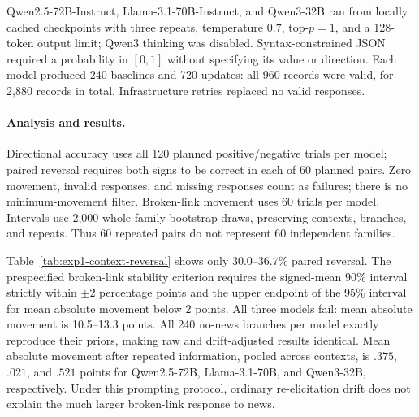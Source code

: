 Qwen2.5-72B-Instruct, Llama-3.1-70B-Instruct, and Qwen3-32B ran from locally cached
checkpoints with three repeats, temperature $0.7$, top-$p=1$, and a 128-token
output limit; Qwen3 thinking was disabled. Syntax-constrained JSON required a
probability in $[0,1]$ without specifying its value or direction. Each model
produced 240 baselines and 720 updates: all 960 records were valid, for 2,880
records in total. Infrastructure retries replaced no valid responses.

\paragraph{Analysis and results.}
Directional accuracy uses all 120 planned positive/negative trials per model;
paired reversal requires both signs to be correct in each of 60 planned pairs.
Zero movement, invalid responses, and missing responses count as failures; there
is no minimum-movement filter. Broken-link movement uses 60 trials per model.
Intervals use 2,000 whole-family bootstrap draws, preserving contexts, branches,
and repeats. Thus 60 repeated pairs do not represent 60 independent families.

\begin{center}
\begin{minipage}{\linewidth}
\centering
{}
\label{tab:exp1-context-reversal}
\small

\end{minipage}
\end{center}

Table~\ref{tab:exp1-context-reversal} shows only 30.0--36.7\% paired reversal.
The prespecified broken-link stability criterion requires the signed-mean 90\%
interval strictly within $\pm2$ percentage points and the upper endpoint of the
95\% interval for mean absolute movement below 2 points. All three models fail:
mean absolute movement is 10.5--13.3 points. All 240 no-news branches per model
exactly reproduce their priors, making raw and drift-adjusted results identical.
Mean absolute movement after repeated information, pooled across contexts, is
$.375$, $.021$, and $.521$ points for Qwen2.5-72B, Llama-3.1-70B, and Qwen3-32B,
respectively. Under this prompting protocol, ordinary re-elicitation drift does
not explain the much larger broken-link response to news.

